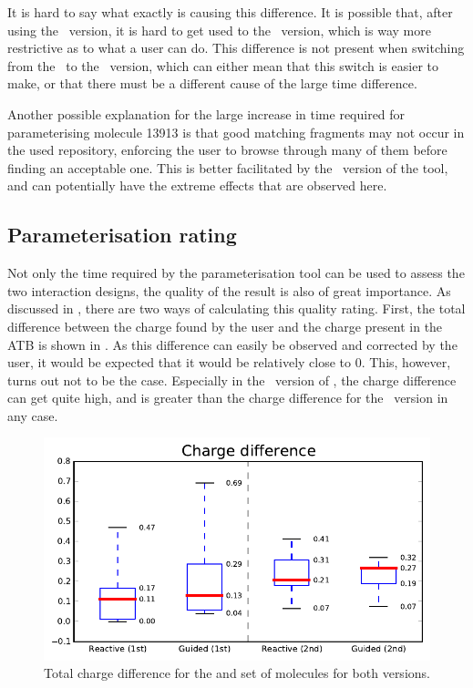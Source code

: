 It is hard to say what exactly is causing this difference. It is possible that, after using the \IDa\ version, it is hard to get used to the \IDb\ version, which is way more restrictive as to what a user can do. This difference is not present when switching from the \IDb\ to the \IDa\ version, which can either mean that this switch is easier to make, or that there must be a different cause of the large time difference.

Another possible explanation for the large increase in time required for parameterising molecule 13913 is that good matching fragments may not occur in the used repository, enforcing the user to browse through many of them before finding an acceptable one. This is better facilitated by the \IDa\ version of the tool, and can potentially have the extreme effects that are observed here.


\subsection{Parameterisation rating}

Not only the time required by the parameterisation tool can be used to assess the two interaction designs, the quality of the result is also of great importance. As discussed in , there are two ways of calculating this quality rating. First, the total difference between the charge found by the user and the charge present in the ATB is shown in . As this difference can easily be observed and corrected by the user, it would be expected that it would be relatively close to 0. This, however, turns out not to be the case. Especially in the \IDb\ version of \oframp, the charge difference can get quite high, and is greater than the charge difference for the \IDa\ version in any case.

\begin{figure}[h!]
\center
\includegraphics[width=.6\textwidth]{img/graphs/1a_00.pdf}
\caption{Total charge difference for the  and  set of molecules for both versions.}
\end{figure}

